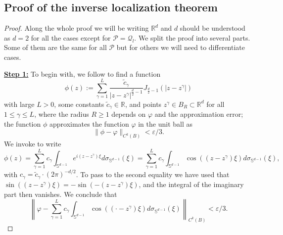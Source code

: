 \documentclass{amsart}
\theoremstyle{definition}
\theoremstyle{remark}
\newcommand{\ep}{\varepsilon}
\newcommand{\vp}{\varphi}
\renewcommand\leq\leqslant
\renewcommand\geq\geqslant
\numberwithin{equation}{section}
\theoremstyle{definition}
\theoremstyle{remark}
\begin{document}
\subsection{Proof of the inverse localization theorem}
\begin{proof}
	Along the whole proof we will be writing $\mathbb{R}^d$ and $d$ should be understood as $d=2$ for all the cases except for $\mathcal{P}=\mathcal{Q}_l$. We split the proof into several parts. Some of them are the same for all $\mathcal{P}$ but for others we will need to differentiate cases.
	
\textbf{	\underline{Step 1:}}	To begin with, we follow \cite[Proposition 2.2]{EPT21} to find a function \begin{equation}
		\phi(z):=\sum_{\gamma=1}^{L} \frac{\tilde{c}_\gamma}{\left|z-z^\gamma\right|^{\frac{d}{2}-1}} J_{\frac{d}{2}-1}\left(\left|z-z^\gamma\right|\right)
	\end{equation}
	with large $L>0$, some constants $\tilde{c}_\gamma\in\mathbb{R}$, and points $z^\gamma\in B_R\subset\mathbb{R}^d$ for all $1\leq \gamma\leq L$, where the radius $R\geq 1$ depends on $\vp$ and the approximation error; the function $\phi$	approximates the function $\vp$ in the unit ball as
	\begin{equation}
		\|\phi-\varphi\|_{C^k(B)}<\ep/3 .
	\end{equation}
	We invoke \cite[Proposition 2.1]{EPR20} to write 
	\begin{equation}
		\phi(z)=\sum_{\gamma=1}^{L} c_\gamma\int_{\mathbb{S}^{d-1}}e^{i(z-z^\gamma)\xi}d\sigma_{\mathbb{S}^{d-1}}(\xi)=\sum_{\gamma=1}^{L}c_\gamma\int_{\mathbb{S}^{d-1}}\cos\left((z-z^\gamma)\xi\right)d\sigma_{\mathbb{S}^{d-1}}(\xi), 
	\end{equation}with $c_\gamma=\tilde{c}_\gamma\cdot\left(2\pi\right)^{-d/2}$. To pass to the second equality we have used that~$\sin((z-z^\gamma)\xi)=-\sin(-(z-z^\gamma)\xi)$, and the integral of the imaginary part then vanishes. We conclude that
	\begin{equation}
		\left\|\vp-\sum_{\gamma=1}^{L}c_\gamma\int_{\mathbb{S}^{d-1}}\cos\left((\cdot-z^\gamma)\xi\right)d\sigma_{\mathbb{S}^{d-1}}(\xi)\right\|_{C^k(B)}<\ep/3 .
	\end{equation}
	

\end{proof}
\end{document}

